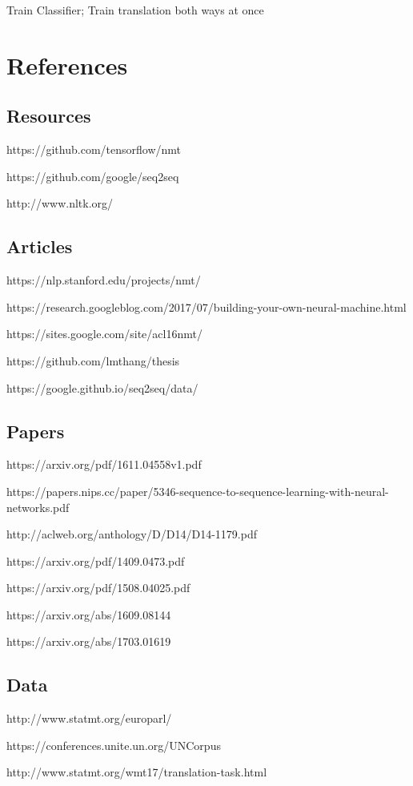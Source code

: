 \documentclass[10pt,a4paper]{report}
\begin{document}
Train Classifier; Train translation both ways at once

\section{References}
\subsection{Resources}

https://github.com/tensorflow/nmt

https://github.com/google/seq2seq

http://www.nltk.org/

\subsection{Articles}

https://nlp.stanford.edu/projects/nmt/

https://research.googleblog.com/2017/07/building-your-own-neural-machine.html

https://sites.google.com/site/acl16nmt/

https://github.com/lmthang/thesis

https://google.github.io/seq2seq/data/


\subsection{Papers}

https://arxiv.org/pdf/1611.04558v1.pdf

https://papers.nips.cc/paper/5346-sequence-to-sequence-learning-with-neural-networks.pdf

http://aclweb.org/anthology/D/D14/D14-1179.pdf

https://arxiv.org/pdf/1409.0473.pdf

https://arxiv.org/pdf/1508.04025.pdf

https://arxiv.org/abs/1609.08144

https://arxiv.org/abs/1703.01619


\subsection{Data}

http://www.statmt.org/europarl/

https://conferences.unite.un.org/UNCorpus

http://www.statmt.org/wmt17/translation-task.html
\end{document}
